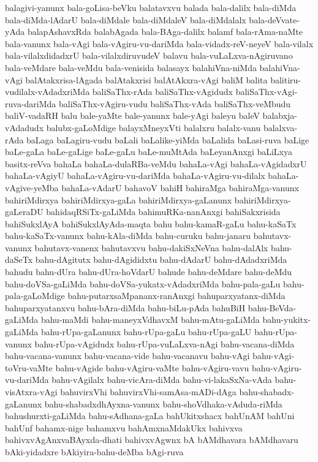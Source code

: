 {balagivi-yanunx
bala-goLisa-beVku
balatavxvu
balada
bala-dalilx
bala-diMda
bala-diMda-lAdarU
bala-diMdale
bala-diMdaleV
bala-diMdalalx
bala-deVvate-yAda
balapAshavxRda
balabAgada
bala-BAga-dalilx
balamf
bala-rAma-naMte
bala-vanunx
bala-vAgi
bala-vAgiru-vu-dariMda
bala-vidadx-reV-neyeV
bala-vilalx
bala-vilalxdidadxrU
bala-vilalxdiruvudeV
balavu
bala-vuLaLxva-nAgiruvano
bala-veMdare
bala-veMdu
bala-venisida
balasayx
balahiVna-niMda
balahiVna-vAgi
balAtakxrisa-lAgada
balAtakxrisi
balAtAkxra-vAgi
baliM
balita
balitiru-vudilalx-vAdadxriMda
baliSaThx-rAda
baliSaThx-vAgidudx
baliSaThx-vAgi-ruva-dariMda
baliSaThx-vAgiru-vudu
baliSaThx-vAda
baliSaThx-veMbudu
baliV-vadaRH
balu
bale-yaMte
bale-yanunx
bale-yAgi
baleyu
baleV
balabxja-vAdadudx
balubx-gaLoMdige
balayxMneyxVti
balalxru
balalx-vanu
balalxva-rAda
baLaga
baLagiru-vudu
baLali
baLalike-yiMda
baLalida
baLasi-ruva
baLige
baLe-gaLa
baLe-gaLige
baLe-gaLu
baLe-muMtAda
baLeyanAnxgi
baLiLxya
basitx-reVva
bahaLa
bahaLa-dulaRBa-veMdu
bahaLa-vAgi
bahaLa-vAgidadxrU
bahaLa-vAgiyU
bahaLa-vAgiru-vu-dariMda
bahaLa-vAgiru-vu-dilalx
bahaLa-vAgive-yeMba
bahaLa-vAdarU
bahavoV
bahiH
bahiraMga
bahiraMga-vanunx
bahiriMdirxya
bahiriMdirxya-gaLa
bahiriMdirxya-gaLanunx
bahiriMdirxya-gaLeraDU
bahidaqRSiTx-gaLiMda
bahimuRKa-nanAnxgi
bahiSakxrisida
bahiSukxlAyA
bahiSukxlAyAda-maqta
bahu
bahu-kamaR-gaLu
bahu-kaSaTx
bahu-kaSaTx-vanunx
bahu-kAla-diMda
bahu-curuku
bahu-janaru
bahutavx-vanunx
bahutavx-vanenx
bahutavxvu
bahu-dakiSxNeVna
bahu-dalAlx
bahu-daSeTx
bahu-dAgitutx
bahu-dAgididxtu
bahu-dAdarU
bahu-dAdadxriMda
bahudu
bahu-dUra
bahu-dUra-hoVdarU
bahude
bahu-deMdare
bahu-deMdu
bahu-doVSa-gaLiMda
bahu-doVSa-yukatx-vAdadxriMda
bahu-pala-gaLu
bahu-pala-gaLoMdige
bahu-putarxsaMpananx-ranAnxgi
bahuparxyatanx-diMda
bahuparxyatanxvu
bahu-bAra-diMda
bahu-biLu-pAda
bahuBiH
bahu-BeVda-gaLiMda
bahu-maMdi
bahu-maneyxVdhavxM
bahu-mAtu-gaLiMda
bahu-yukitx-gaLiMda
bahu-rUpa-gaLanunx
bahu-rUpa-gaLu
bahu-rUpa-gaLU
bahu-rUpa-vanunx
bahu-rUpa-vAgidudx
bahu-rUpa-vuLaLxva-nAgi
bahu-vacana-diMda
bahu-vacana-vanunx
bahu-vacana-vide
bahu-vacanavu
bahu-vAgi
bahu-vAgi-toVru-vaMte
bahu-vAgide
bahu-vAgiru-vaMte
bahu-vAgiru-vavu
bahu-vAgiru-vu-dariMda
bahu-vAgilalx
bahu-vicAra-diMda
bahu-vi-lakaSxNa-vAda
bahu-visAtxra-vAgi
bahuvirxVhi
bahuvirxVhi-samAsa-mADi-dAga
bahu-shabadx-gaLanunx
bahu-shabadxdhAyxna-vanunx
bahu-shoVdhaka-vAduda-riMda
bahushurxti-gaLiMda
bahu-sAdhana-gaLa
bahUkitxshacx
bahUnAM
bahUni
bahUnf
bahamx-nige
bahamxvu
bahAmxnaMdakUkx
bahivxva
bahivxvAgAnxvaBAyxda-dhati
bahivxvAgwnx
bA
bAMdhavara
bAMdhavaru
bAki-yidadxre
bAkiyira-bahu-deMba
bAgi-ruva
}
